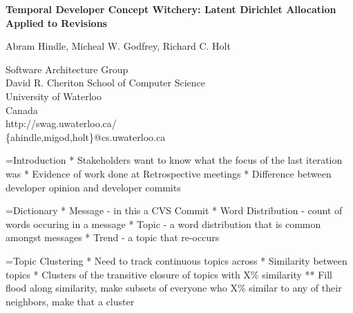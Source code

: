\documentclass[titlepage,usenames,a4,landscape,semhelv]{seminar}
\author{
\names \\ 
{\small Software Architecture Group }\\
\small David R. Cheriton School of Computer Science\\
\small University of Waterloo\\
\small Canada\\
ahindle@cs.uwaterloo.ca
}
\newcommand{\gettitle}{Temporal Developer Concept Witchery: Latent Dirichlet Allocation Applied to Revisions}
\newcommand{\gettitleproper}{\gettitle}
\newcommand{\names}{Abram Hindle, Micheal W. Godfrey, Richard C. Holt}
\begin{document}
\pagestyle{fancy} %
\begin{slide}

\begin{center}
{\bf \LARGE \gettitleproper }

{\names } 

{\small Software Architecture Group }\\[-.5em]
{\small David R. Cheriton School of Computer Science}\\[-.5em]
{\small University of Waterloo}\\[-.5em]
{\small Canada}\\[-.5em]
{\small http://swag.uwaterloo.ca/}\\
\{ahindle,migod,holt\}@cs.uwaterloo.ca


\end{center}

=Introduction
* Stakeholders want to know what the focus of the last iteration was
* Evidence of work done at Retrospective meetings
* Difference between developer opinion and developer commits

=Dictionary
* Message - in this a CVS Commit
* Word Distribution - count of words occuring in a message
* Topic - a word distribution that is common amongst messages
* Trend - a topic that re-occurs


=Topic Clustering 
* Need to track continuous topics across 
* Similarity between topics
* Clusters of the transitive closure of topics with X\% similarity
** Fill flood along similarity, make subsets of everyone who X\% similar to any of their neighbors, make that a cluster

\newslide







\newslide

\begin{specquotef}
\centering
\begin{tabular}{|ccc|l|}


\end{tabular}
\end{specquotef}
\end{slide}
\end{document}
